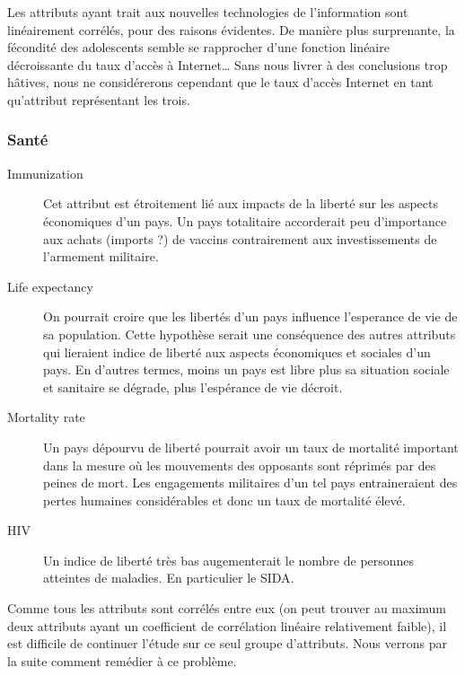 Les attributs ayant trait aux nouvelles technologies de l'information sont linéairement corrélés, pour des raisons évidentes. De manière plus surprenante, la fécondité des adolescents semble se rapprocher d'une fonction linéaire décroissante du taux d'accès à Internet\ldots
Sans nous livrer à des conclusions trop hâtives, nous ne considérerons cependant que le taux d'accès Internet en tant qu'attribut représentant les trois.

\subsubsection{Santé}
\begin{description}
\item [Immunization]
Cet attribut est étroitement lié aux impacts de la liberté sur les aspects économiques d'un pays. Un pays totalitaire
accorderait peu d'importance aux achats (imports ?) de vaccins contrairement aux investissements de l'armement militaire.
\item [Life expectancy]
On pourrait croire que les libertés d'un pays influence l'esperance de vie de sa population. Cette hypothèse serait une conséquence
des autres attributs qui lieraient indice de liberté aux aspects économiques et sociales d'un pays. En d'autres termes, moins un pays est libre plus sa situation sociale et sanitaire se dégrade, plus l'espérance de vie décroit.
\item [Mortality rate]
Un pays dépourvu de liberté pourrait avoir un taux de mortalité important dans la mesure où les mouvements des opposants sont réprimés par des peines de mort.
Les engagements militaires d'un tel pays entraineraient des pertes humaines considérables et donc un taux de mortalité élevé.
\item [HIV]
Un indice de liberté très bas augementerait le nombre de personnes atteintes de maladies. En particulier le SIDA.
\end{description}

Comme tous les attributs sont corrélés entre eux (on peut trouver au maximum deux attributs ayant un coefficient de corrélation linéaire relativement faible), il est difficile de continuer l'étude sur ce seul groupe d'attributs. Nous verrons par la suite comment remédier à ce problème.


